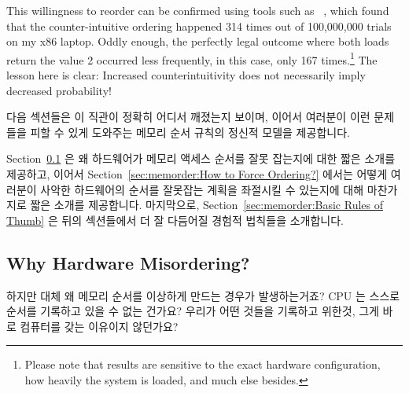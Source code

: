 This willingness to reorder can be confirmed using tools such as
~\cite{Alglave:2014:HCM:2594291.2594347},
which found that the counter-intuitive ordering happened
314 times out of 100,000,000 trials on my x86 laptop.
Oddly enough, the perfectly legal outcome where both loads return the
value 2 occurred less frequently, in this case, only 167 times.\footnote{
	Please note that results are sensitive to the exact hardware
	configuration,
	how heavily the system is loaded, and much else besides.}
The lesson here is clear: Increased counterintuitivity does not necessarily
imply decreased probability!
\fi

다음 섹션들은 이 직관이 정확히 어디서 깨졌는지 보이며, 이어서 여러분이 이런
문제들을 피할 수 있게 도와주는 메모리 순서 규칙의 정신적 모델을 제공합니다.

Section~\ref{sec:memorder:Why Hardware Misordering?}
은 왜 하드웨어가 메모리 액세스 순서를 잘못 잡는지에 대한 짧은 소개를 제공하고,
이어서
Section~\ref{sec:memorder:How to Force Ordering?}
에서는 어떻게 여러분이 사악한 하드웨어의 순서를 잘못잡는 계획을 좌절시킬
수 있는지에 대해 마찬가지로 짧은 소개를 제공합니다.
마지막으로, Section~\ref{sec:memorder:Basic Rules of Thumb} 은 뒤의 섹션들에서
더 잘 다듬어질 경험적 법칙들을 소개합니다.

\subsection{Why Hardware Misordering?}
\label{sec:memorder:Why Hardware Misordering?}

하지만 대체 왜 메모리 순서를 이상하게 만드는 경우가 발생하는거죠?
CPU 는 스스로 순서를 기록하고 있을 수 없는 건가요?
우리가 어떤 것들을 기록하고 위한것, 그게 바로 컴퓨터를 갖는 이유이지 않던가요?
\iffalse

